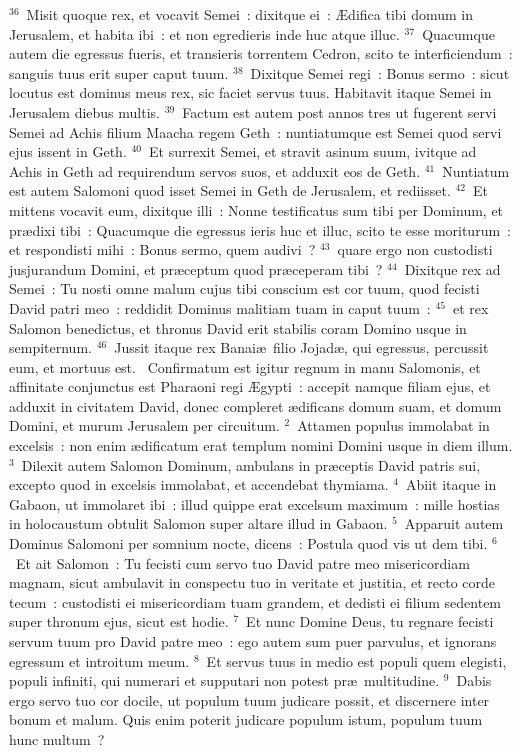 ${}^{36}$~Misit quoque rex, et vocavit Semei~: dixitque ei~: \AE difica tibi domum in Jerusalem, et habita ibi~: et non egredieris inde huc atque illuc.
${}^{37}$~Quacumque autem die egressus fueris, et transieris torrentem Cedron, scito te interficiendum~: sanguis tuus erit super caput tuum.
${}^{38}$~Dixitque Semei regi~: Bonus sermo~: sicut locutus est dominus meus rex, sic faciet servus tuus. Habitavit itaque Semei in Jerusalem diebus multis.
${}^{39}$~Factum est autem post annos tres ut fugerent servi Semei ad Achis filium Maacha regem Geth~: nuntiatumque est Semei quod servi ejus issent in Geth.
${}^{40}$~Et surrexit Semei, et stravit asinum suum, ivitque ad Achis in Geth ad requirendum servos suos, et adduxit eos de Geth.
${}^{41}$~Nuntiatum est autem Salomoni quod isset Semei in Geth de Jerusalem, et rediisset.
${}^{42}$~Et mittens vocavit eum, dixitque illi~: Nonne testificatus sum tibi per Dominum, et pr\ae dixi tibi~: Quacumque die egressus ieris huc et illuc, scito te esse moriturum~: et respondisti mihi~: Bonus sermo, quem audivi~?
${}^{43}$~quare ergo non custodisti jusjurandum Domini, et pr\ae ceptum quod pr\ae ceperam tibi~?
${}^{44}$~Dixitque rex ad Semei~: Tu nosti omne malum cujus tibi conscium est cor tuum, quod fecisti David patri meo~: reddidit Dominus malitiam tuam in caput tuum~:
${}^{45}$~et rex Salomon benedictus, et thronus David erit stabilis coram Domino usque in sempiternum.
${}^{46}$~Jussit itaque rex Banai\ae\ filio Jojad\ae , qui egressus, percussit eum, et mortuus est.
~\lettrine[lines=10,image=true,loversize=0.05,lraise=-0.03]{C}{}onfirmatum est igitur regnum in manu Salomonis, et affinitate conjunctus est Pharaoni regi \AE gypti~: accepit namque filiam ejus, et adduxit in civitatem David, donec compleret \ae dificans domum suam, et domum Domini, et murum Jerusalem per circuitum.
${}^{2}$~Attamen populus immolabat in excelsis~: non enim \ae dificatum erat templum nomini Domini usque in diem illum.
${}^{3}$~Dilexit autem Salomon Dominum, ambulans in pr\ae ceptis David patris sui, excepto quod in excelsis immolabat, et accendebat thymiama.
${}^{4}$~Abiit itaque in Gabaon, ut immolaret ibi~: illud quippe erat excelsum maximum~: mille hostias in holocaustum obtulit Salomon super altare illud in Gabaon.
${}^{5}$~Apparuit autem Dominus Salomoni per somnium nocte, dicens~: Postula quod vis ut dem tibi.
${}^{6}$~Et ait Salomon~: Tu fecisti cum servo tuo David patre meo misericordiam magnam, sicut ambulavit in conspectu tuo in veritate et justitia, et recto corde tecum~: custodisti ei misericordiam tuam grandem, et dedisti ei filium sedentem super thronum ejus, sicut est hodie.
${}^{7}$~Et nunc Domine Deus, tu regnare fecisti servum tuum pro David patre meo~: ego autem sum puer parvulus, et ignorans egressum et introitum meum.
${}^{8}$~Et servus tuus in medio est populi quem elegisti, populi infiniti, qui numerari et supputari non potest pr\ae\ multitudine.
${}^{9}$~Dabis ergo servo tuo cor docile, ut populum tuum judicare possit, et discernere inter bonum et malum. Quis enim poterit judicare populum istum, populum tuum hunc multum~?


